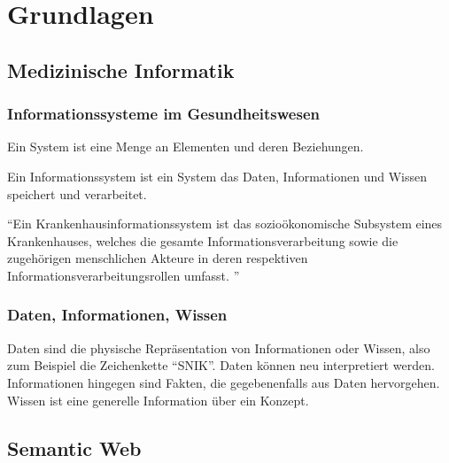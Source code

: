 \chapter{Grundlagen}\label{ch:preliminaries}

\section{Medizinische Informatik}

\subsection{Informationssysteme im Gesundheitswesen}

\begin{definition}[System]
Ein System ist eine Menge an Elementen und deren Beziehungen. \citep[S.~30]{bb}
\end{definition}
\begin{definition}[Informationssystem]
Ein Informationssystem ist ein System das Daten, Informationen und Wissen speichert und verarbeitet. \citep[S.~30]{bb}
\end{definition}

\begin{definition}
\enquote{Ein Krankenhausinformationssystem ist das sozioökonomische Subsystem eines Krankenhauses, welches die gesamte Informationsverarbeitung sowie die zugehörigen menschlichen Akteure in deren respektiven Informationsverarbeitungsrollen umfasst. \citep[S.~37]{bb}}
\end{definition}

\subsection{Daten, Informationen, Wissen}
Daten sind die physische Repräsentation von Informationen oder Wissen, also zum Beispiel die Zeichenkette \enquote{SNIK}. Daten können neu interpretiert werden.
Informationen hingegen sind Fakten, die gegebenenfalls aus Daten hervorgehen.
Wissen ist eine generelle Information über ein Konzept. \citep[S.~29]{bb}

\section{Semantic Web}

